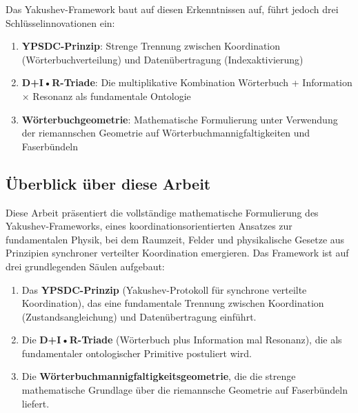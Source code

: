 \documentclass[11pt,a4paper]{article}
\begin{document}
	Das Yakushev-Framework baut auf diesen Erkenntnissen auf, führt jedoch drei Schlüsselinnovationen ein:
	\begin{enumerate}
		\item \textbf{YPSDC-Prinzip}: Strenge Trennung zwischen Koordination (Wörterbuchverteilung) und Datenübertragung (Indexaktivierung)
		\item \textbf{D+I•R-Triade}: Die multiplikative Kombination Wörterbuch + Information × Resonanz als fundamentale Ontologie
		\item \textbf{Wörterbuchgeometrie}: Mathematische Formulierung unter Verwendung der riemannschen Geometrie auf Wörterbuchmannigfaltigkeiten und Faserbündeln
	\end{enumerate}
	
	
	\subsection{Überblick über diese Arbeit}
	Diese Arbeit präsentiert die vollständige mathematische Formulierung des Yakushev-Frameworks, eines koordinationsorientierten Ansatzes zur fundamentalen Physik, bei dem Raumzeit, Felder und physikalische Gesetze aus Prinzipien synchroner verteilter Koordination emergieren. Das Framework ist auf drei grundlegenden Säulen aufgebaut:
	\begin{enumerate}
		\item Das \textbf{YPSDC-Prinzip} (Yakushev-Protokoll für synchrone verteilte Koordination), das eine fundamentale Trennung zwischen Koordination (Zustandsangleichung) und Datenübertragung einführt.
		\item Die \textbf{D+I•R-Triade} (Wörterbuch plus Information mal Resonanz), die als fundamentaler ontologischer Primitive postuliert wird.
		\item Die \textbf{Wörterbuchmannigfaltigkeitsgeometrie}, die die strenge mathematische Grundlage über die riemannsche Geometrie auf Faserbündeln liefert.
	\end{enumerate}
	
\end{document}
